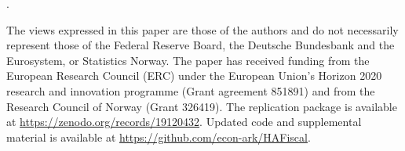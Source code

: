 \documentclass{econsocart}
\begin{document}
\begin{authorsinfo}
  \noindent {}. \newline
   \newline
   \newline
   \newline
\end{authorsinfo}


\newcommand{\thanksInput}[1]{%
  \IfFileExists{\latexroot/Subfiles/#1.tex}%
  {\ignorespaces\unskip}%
  {}%
}%

\whenintegrated{\label{funding-info}} %
\vspace{0.3\baselineskip}
\begin{minipage}{\textwidth}
  \footnotesize The views expressed in this paper are those of the authors and do not necessarily represent those of the Federal Reserve Board, the Deutsche Bundesbank and the Eurosystem, or Statistics Norway. The paper has received funding from the European Research Council (ERC) under the European Union's Horizon 2020 research and innovation programme (Grant agreement 851891) and from the Research Council of Norway (Grant 326419). The replication package is available at \url{https://zenodo.org/records/19120432}. Updated code and supplemental material is available at \url{https://github.com/econ-ark/HAFiscal}.

  
\end{minipage}
\end{document}
